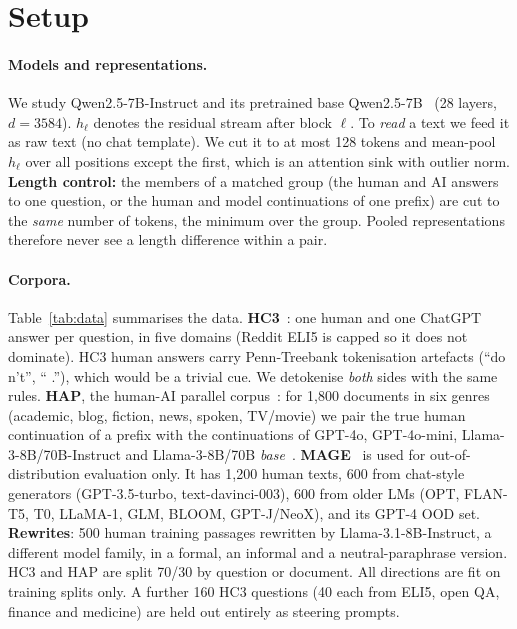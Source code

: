 \section{Setup}
\label{sec:method}

\paragraph{Models and representations.} We study Qwen2.5-7B-Instruct and its pretrained base Qwen2.5-7B~\citep{qwen2025qwen25} (28 layers, $d{=}3584$). $h_\ell$ denotes the residual stream after block $\ell$. To \emph{read} a text we feed it as raw text (no chat template). We cut it to at most 128 tokens and mean-pool $h_\ell$ over all positions except the first, which is an attention sink with outlier norm. \textbf{Length control:} the members of a matched group (the human and AI answers to one question, or the human and model continuations of one prefix) are cut to the \emph{same} number of tokens, the minimum over the group. Pooled representations therefore never see a length difference within a pair.

\paragraph{Corpora.} Table~\ref{tab:data} summarises the data. \textbf{HC3}~\citep{guo2023hc3}: one human and one ChatGPT answer per question, in five domains (Reddit ELI5 is capped so it does not dominate). HC3 human answers carry Penn-Treebank tokenisation artefacts (``do n't'', `` .''), which would be a trivial cue. We detokenise \emph{both} sides with the same rules. \textbf{HAP}, the human-AI parallel corpus~\citep{reinhart2025llms}: for 1{,}800 documents in six genres (academic, blog, fiction, news, spoken, TV/movie) we pair the true human continuation of a prefix with the continuations of GPT-4o, GPT-4o-mini, Llama-3-8B/70B-Instruct and Llama-3-8B/70B \emph{base}~\citep{grattafiori2024llama3}. \textbf{MAGE}~\citep{li2024mage} is used for out-of-distribution evaluation only. It has 1{,}200 human texts, 600 from chat-style generators (GPT-3.5-turbo, text-davinci-003), 600 from older LMs (OPT, FLAN-T5, T0, LLaMA-1, GLM, BLOOM, GPT-J/NeoX), and its GPT-4 OOD set. \textbf{Rewrites}: 500 human training passages rewritten by Llama-3.1-8B-Instruct, a different model family, in a formal, an informal and a neutral-paraphrase version. HC3 and HAP are split 70/30 by question or document. All directions are fit on training splits only. A further 160 HC3 questions (40 each from ELI5, open QA, finance and medicine) are held out entirely as steering prompts.

